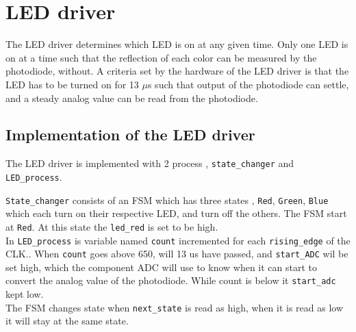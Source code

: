 \section{LED driver}
The LED driver determines which LED is on at any given time.
Only one LED is on at a time such that the reflection of each color can be measured by the photodiode, without.
A criteria set by the hardware of the LED driver is that the LED has to be turned on for 13 $\mu$s such that output of the photodiode can settle, and a steady analog value can be read from the photodiode. 
\subsection{Implementation of the LED driver}


The LED driver is implemented with 2 process , \texttt{state\_changer} and \texttt{LED\_process}. 

\texttt{State\_changer} consists of an  FSM which has three states , \texttt{Red}, \texttt{Green}, \texttt{Blue} which each turn on their respective LED, and turn off the others.  The FSM start at \texttt{Red}.  At this state the \texttt{led\_red} is set to be high.\\


In \texttt{LED\_process}  is  variable named \texttt{count} incremented for each \texttt{rising\_edge} of the CLK..  When \texttt{count} goes above 650, will 13 us have passed, and  \texttt{start\_ADC} wil be set high, which the component ADC will use to know when it can start to convert the analog value of the photodiode. While count is below it \texttt{start\_adc} kept low.  \\

The FSM changes state when \texttt{next\_state} is read as high,  when it is read as low it will stay at the same state. 



